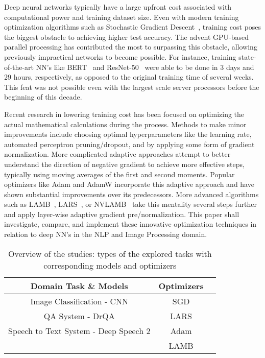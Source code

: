 Deep neural networks typically have a large upfront cost associated with computational power and training dataset size. Even with modern training optimization algorithms such as Stochastic Gradient Descent~\cite{SGD}, training cost poses the biggest obstacle to achieving higher test accuracy. The advent GPU-based parallel processing has contributed the most to surpassing this obstacle, allowing previously impractical networks to become possible. For instance, training state-of-the-art NN's like BERT~\cite{bert} and ResNet-50~\cite{resnet} were able to be done in 3 days and 29 hours, respectively, as opposed to the original training time of several weeks. This feat was not possible even with the largest scale server processors before the beginning of this decade. 

Recent research in lowering training cost has been focused on optimizing the actual mathematical calculations during the process. Methods to make minor improvements include choosing optimal hyperparameters like the learning rate, automated perceptron pruning/dropout\cite{autopercept}, and by applying some form of gradient normalization. More complicated adaptive approaches attempt to better understand the direction of negative gradient to achieve more effective steps, typically using moving averages of the first and second moments. Popular optimizers like Adam and AdamW incorporate this adaptive approach and have shown substantial improvements over its predecessors\cite{Loshchilov2017FixingWD}. More advanced algorithms such as LAMB~\cite{You2020Large}, LARS~\cite{qian2020impact, ginsburg2018large}, or NVLAMB~\cite{nvidia_nvlamb}  take this mentality several steps further and apply layer-wise adaptive gradient pre/normalization. This paper shall investigate, compare, and implement these innovative optimization techniques in relation to deep NN's in the NLP and Image Processing domain. 


\begin{table}[t]
\centering
\caption{Overview of the studies: types of the explored tasks with corresponding models and optimizers}
\label{tab:LargeBatch}
\begin{tabular}{ccc} 
 \toprule
\textbf{Domain Task \& Models} & \textbf{Optimizers} \\
 \midrule
  Image Classification - CNN \cite{CNN} & SGD \cite{SGD} \\
  QA System - DrQA \cite{DrQA} & LARS \cite{ginsburg2018large} \\ 
  Speech to Text System - Deep Speech 2 \cite{deepspeech} & Adam \cite{adam} \\
  &  LAMB \cite{You2020Large} \\
  \bottomrule
\end{tabular}
\end{table}

